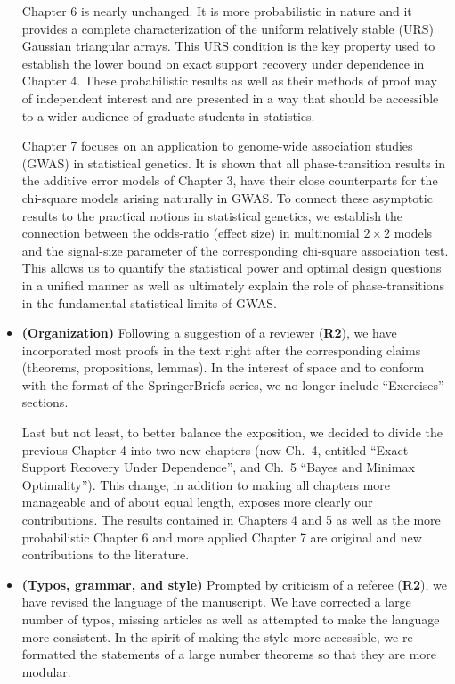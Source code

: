 \documentclass[11pt]{article}
\begin{document}
\begin{itemize}
   Chapter 6 is nearly unchanged. It is more probabilistic in nature and it provides a complete characterization of the uniform relatively stable (URS) Gaussian 
   triangular arrays.  This URS condition is the key property used to establish the lower bound on exact support recovery under dependence in Chapter 4. 
   These probabilistic results as well as their methods of proof may of independent interest and are presented in a way that should be 
   accessible to a wider audience of graduate students in statistics. 
   
   Chapter 7 focuses on an application to genome-wide association studies (GWAS) in statistical genetics.  It is shown that all phase-transition results in the 
    additive error models of Chapter 3, have their close counterparts for the chi-square models arising naturally in GWAS. To connect these
    asymptotic results to the practical notions in statistical genetics, we establish the connection between the odds-ratio (effect size) in multinomial 
    $2\times 2$ models
    and the signal-size parameter of the corresponding chi-square association test.  This allows us to quantify the statistical power and
     optimal design questions in a unified manner as well as ultimately explain the role of phase-transitions in the fundamental statistical limits of GWAS.
    
  
 
  \item {\bf (Organization)} Following a suggestion of a reviewer ({\bf R2}),  we have incorporated most proofs 
  in the text right after the corresponding claims (theorems, propositions, lemmas).  In the interest of space and to conform with the format of
  the SpringerBriefs series, we no longer include ``Exercises'' sections. 
  
  Last but not least, to better balance the exposition, we decided to divide the previous
  Chapter 4 into two new chapters (now Ch.\ 4, entitled ``Exact Support Recovery Under Dependence'', 
  and Ch.\ 5 ``Bayes and Minimax Optimality'').  This change, in addition to making all chapters more manageable and of about equal length, 
  exposes more clearly our contributions.  The results contained in Chapters 4 and 5 as well as the more probabilistic Chapter 6 and more 
  applied Chapter 7 are 
  original and new contributions to the literature.
  
  \item {\bf (Typos, grammar, and style)}  Prompted by criticism of a referee ({\bf R2}), we have revised the language of the manuscript. 
  We have corrected a large number of typos, missing articles as well as attempted to make the language more consistent.  In the spirit of
  making the style more accessible, we re-formatted the statements of a large number theorems so that they are more modular. 


\end{itemize}
\end{document}
